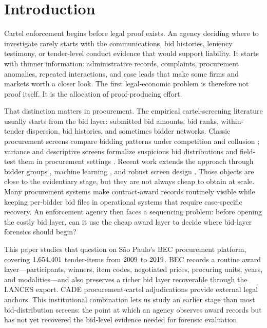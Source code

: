 \section{Introduction}
\label{sec:intro}

Cartel enforcement begins before legal proof exists. An
agency deciding where to investigate rarely starts with the
communications, bid histories, leniency testimony, or
tender-level conduct evidence that would support liability.
It starts with thinner information: administrative records,
complaints, procurement anomalies, repeated interactions, and
case leads that make some firms and markets worth a closer
look. The first legal-economic problem is therefore not proof
itself. It is the allocation of proof-producing effort.

That distinction matters in procurement. The empirical
cartel-screening literature usually starts from the bid layer:
submitted bid amounts, bid ranks, within-tender dispersion,
bid histories, and sometimes bidder networks. Classic
procurement screens compare bidding patterns under competition
and collusion \citep{porter1993detection,bajari2003deciding};
variance and descriptive screens formalize suspicious bid
distributions \citep{abrantesmetz2006a,harrington2008detecting}
and field-test them in procurement settings
\citep{imhof2018screening,imhof2019detecting}. Recent work
extends the approach through bidder groups
\citep{conley2016detecting}, machine learning
\citep{huber2019machine,wallimann2023machine}, and robust
screen design \citep{chassang2022robust}.
Those objects are close to the evidentiary stage, but they are
not always cheap to obtain at scale. Many procurement systems
make contract-award records routinely visible while keeping
per-bidder bid files in operational systems that require
case-specific recovery. An enforcement agency then faces a
sequencing problem: before opening the costly bid layer, can it
use the cheap award layer to decide where bid-layer forensics
should begin?

This paper studies that question on S\~ao Paulo's BEC
procurement platform, covering $1{,}654{,}401$ tender-items from
$2009$ to $2019$. BEC records a routine
award layer---participants, winners, item codes, negotiated
prices, procuring units, years, and modalities---and also
preserves a richer bid layer recoverable through the LANCES
export. CADE procurement-cartel adjudications provide external
legal anchors. This institutional combination lets us study an
earlier stage than most bid-distribution screens: the point at
which an agency observes award records but has not yet recovered
the bid-level evidence needed for forensic evaluation.

